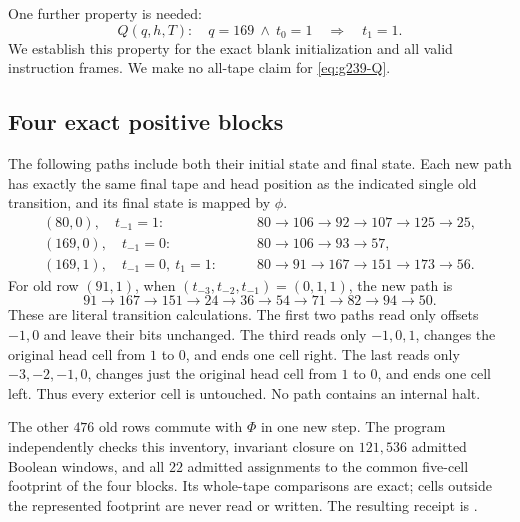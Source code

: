 One further property is needed:
\begin{equation}
\label{eq:g239-Q}
Q(q,h,T):\quad q=169\ \wedge\ t_0=1\quad\Longrightarrow\quad t_1=1.
\end{equation}
We establish this property for the exact blank initialization and all
valid instruction frames.  We make no all-tape claim for
\eqref{eq:g239-Q}.

\subsection{Four exact positive blocks}

The following paths include both their initial state and final state.
Each new path has exactly the same final tape and head position as
the indicated single old transition, and its final state is mapped
by $\phi$.
\begin{align*}
(80,0),\quad t_{-1}=1:
&\qquad 80\to106\to92\to107\to125\to25,
\tag{5 steps}\label{eq:g239-block80}\\
(169,0),\quad t_{-1}=0:
&\qquad 80\to106\to93\to57,
\tag{3 steps}\label{eq:g239-block169zero}\\
(169,1),\quad t_{-1}=0,\ t_1=1:
&\qquad 80\to91\to167\to151\to173\to56.
\tag{5 steps}\label{eq:g239-block169one}
\end{align*}
For old row $(91,1)$, when
$(t_{-3},t_{-2},t_{-1})=(0,1,1)$, the new path is
\begin{equation}
91\to167\to151\to24\to36\to54\to71\to82\to94\to50.
\tag{9 steps}\label{eq:g239-block91}
\end{equation}
These are literal transition calculations.  The first two paths read
only offsets $-1,0$ and leave their bits unchanged.  The third reads
only $-1,0,1$, changes the original head cell from $1$ to $0$, and
ends one cell right.  The last reads only $-3,-2,-1,0$, changes just
the original head cell from $1$ to $0$, and ends one cell left.
Thus every exterior cell is untouched.  No path contains an internal
halt.

The other $476$ old rows commute with $\Phi$ in one new step.
The program  independently
checks this inventory, invariant closure on $121{,}536$ admitted
Boolean windows, and all $22$ admitted assignments to the common
five-cell footprint of the four blocks.  Its whole-tape comparisons
are exact; cells outside the represented footprint are never read or
written.  The resulting receipt is
.

